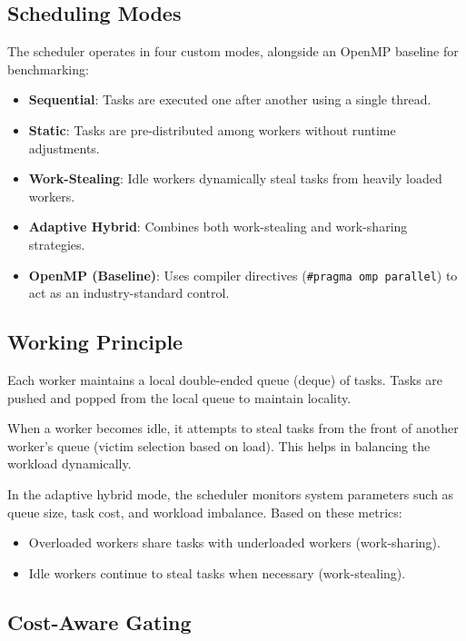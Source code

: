 \documentclass[12pt,a4paper]{article}
\begin{document}
\subsection{Scheduling Modes}

The scheduler operates in four custom modes, alongside an OpenMP baseline for benchmarking:

\begin{itemize}
\item \textbf{Sequential}: Tasks are executed one after another using a single thread.
\item \textbf{Static}: Tasks are pre-distributed among workers without runtime adjustments.
\item \textbf{Work-Stealing}: Idle workers dynamically steal tasks from heavily loaded workers.
\item \textbf{Adaptive Hybrid}: Combines both work-stealing and work-sharing strategies.
\item \textbf{OpenMP (Baseline)}: Uses compiler directives (\texttt{\#pragma omp parallel}) to act as an industry-standard control.
\end{itemize}

\subsection{Working Principle}

Each worker maintains a local double-ended queue (deque) of tasks. Tasks are pushed and popped from the local queue to maintain locality.

When a worker becomes idle, it attempts to steal tasks from the front of another worker's queue (victim selection based on load). This helps in balancing the workload dynamically.

In the adaptive hybrid mode, the scheduler monitors system parameters such as queue size, task cost, and workload imbalance. Based on these metrics:

\begin{itemize}
\item Overloaded workers share tasks with underloaded workers (work-sharing).
\item Idle workers continue to steal tasks when necessary (work-stealing).
\end{itemize}

\subsection{Cost-Aware Gating}
\end{document}
